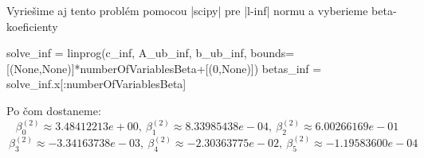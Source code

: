 \documentclass[12pt,oneside,a4paper,slovak]{article}
\begin{document}
Vyriešime aj tento problém pomocou \pyth|scipy| pre \pyth|l-inf| normu a vyberieme beta-koeficienty
\begin{python}
solve_inf = linprog(c_inf, A_ub_inf, b_ub_inf, bounds=[(None,None)]*numberOfVariablesBeta+[(0,None)])
betas_inf = solve_inf.x[:numberOfVariablesBeta]
\end{python}
Po čom dostaneme:
\begin{equation*}
	\beta_0^{(2)} \approx  3.48412213e+00 ,~\beta_1^{(2)} \approx 8.33985438e-04 ,~\beta_2^{(2)} \approx 6.00266169e-01 
\end{equation*}
\begin{equation*}
~\beta_3^{(2)} \approx -3.34163738e-03 ,~\beta_4^{(2)} \approx -2.30363775e-02  ,~\beta_5^{(2)} \approx -1.19583600e-04
\end{equation*}
\end{document}
